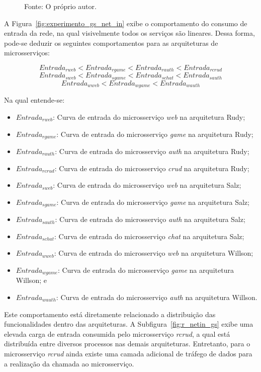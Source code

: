 \begin{figure}[htb!]
    Fonte: O próprio autor.
\end{figure}

A Figura~\ref{fig:experimento_gs_net_in} exibe o comportamento do consumo de entrada da rede, na qual visivelmente todos os serviços são lineares.
%
Dessa forma, pode-se deduzir os seguintes comportamentos para as arquiteturas de microsserviços:

$$
     Entrada_{rweb} < Entrada_{rgame} < Entrada_{rauth} < Entrada_{rcrud}
$$
$$
     Entrada_{sweb} < Entrada_{sgame} < Entrada_{schat} < Entrada_{sauth}
$$
$$
     Entrada_{wweb} < Entrada_{wgame} < Entrada_{wauth}
$$

Na qual entende-se:

\begin{itemize}
 \item $Entrada_{rweb}$: Curva de entrada do microsserviço \textit{web} na arquitetura Rudy;
 \item $Entrada_{rgame}$: Curva de entrada do microsserviço \textit{game} na arquitetura Rudy;
 \item $Entrada_{rauth}$: Curva de entrada do microsserviço \textit{auth} na arquitetura Rudy;
 \item $Entrada_{rcrud}$: Curva de entrada do microsserviço \textit{crud} na arquitetura Rudy;
  \item $Entrada_{sweb}$: Curva de entrada do microsserviço \textit{web} na arquitetura Salz;
 \item $Entrada_{sgame}$: Curva de entrada do microsserviço \textit{game} na arquitetura Salz;
 \item $Entrada_{sauth}$: Curva de entrada do microsserviço \textit{auth} na arquitetura Salz;
 \item $Entrada_{schat}$: Curva de entrada do microsserviço \textit{chat} na arquitetura Salz;
 \item $Entrada_{wweb}$: Curva de entrada do microsserviço \textit{web} na arquitetura Willson;
 \item $Entrada_{wgame}$: Curva de entrada do microsserviço \textit{game} na arquitetura Willson; e
 \item $Entrada_{wauth}$: Curva de entrada do microsserviço \textit{auth} na arquitetura Willson.
\end{itemize}


Este comportamento está diretamente relacionado a distribuição das funcionalidades dentro das arquiteturas.
%
A Subfigura~\ref{fig:r_netin_gs} exibe uma elevada carga de entrada consumida pelo microsserviço \textit{rcrud}, a qual está distribuída entre diversos processos nas demais arquiteturas.
%
Entretanto, para o microsserviço \textit{rcrud} ainda existe uma camada adicional de tráfego de dados para a realização da chamada ao microsserviço.

